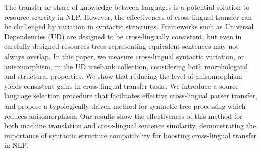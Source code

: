 The transfer or share of knowledge between languages is a potential solution to resource scarcity in NLP. However, the effectiveness of cross-lingual transfer can be challenged by variation in syntactic structures. Frameworks such as Universal Dependencies (UD) are designed to be cross-lingually consistent, but even in carefully designed resources trees representing equivalent sentences may not always overlap. In this paper, we measure cross-lingual syntactic variation,  or anisomorphism, in the UD treebank collection, considering both morphological and structural properties. We show that reducing the level of anisomorphism yields consistent gains in cross-lingual transfer tasks. We introduce a source language selection procedure that facilitates effective cross-lingual parser transfer, and propose a typologically driven method for syntactic tree processing which reduces anisomorphism. Our results show the effectiveness of this method for both machine translation and cross-lingual sentence similarity, demonstrating the importance of syntactic structure compatibility for boosting cross-lingual transfer in NLP.
